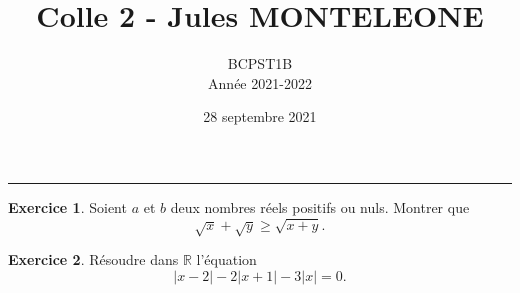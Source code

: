 \documentclass[a4paper, 11pt,openany]{article}%
\title{Colle 2 - Jules MONTELEONE}
\author{BCPST1B\\
Année 2021-2022}
\date{28 septembre 2021}
\theoremstyle{plain}
\theoremstyle{definition}
\newtheorem{exo}{Exercice}
\newtheorem{sol}{Solution de l'exercice}
\theoremstyle{remark}
\newcommand{\R}{\mathbb{R}}
\begin{document}
   \maketitle
      \rule{\linewidth}{0.5mm}



\begin{exo}
Soient $a$ et $b$ deux nombres réels positifs ou nuls. Montrer que
\[ \sqrt{x} + \sqrt{y} \geqslant \sqrt{x + y}.\]
\end{exo}


\begin{exo}
Résoudre dans $\R$ l'équation
\[ |x-2| - 2 |x+1| -3|x| = 0.\]
\end{exo}
\end{document}
